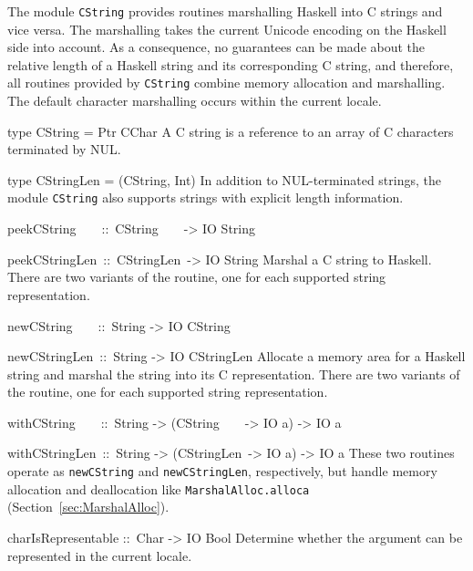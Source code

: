 \documentclass[a4paper,twoside]{article}
\makeatletter
\newcommand{\code}[1]{\texttt{#1}}      %
\newenvironment{codedesc}{%
  \list{}{\labelwidth\z@
    \let\makelabel\codedesclabel}
  }{%
  \endlist
  }
\newcommand*{\codedesclabel}[1]{%
  \hspace{-\leftmargin}
  \parbox[b]{\labelwidth}{\makebox[0pt][l]{\code{#1}}\\}\hfil\relax
  }
\newcommand{\combineitems}{\vspace*{-\itemsep}\vspace*{-\parsep}\vspace*{-1em}}
\makeatother
\begin{document}
The module \code{CString} provides routines marshalling Haskell into C strings
and vice versa.  The marshalling takes the current Unicode encoding on the
Haskell side into account.  As a consequence, no guarantees can be made about
the relative length of a Haskell string and its corresponding C string, and
therefore, all routines provided by \code{CString} combine memory allocation
and marshalling.  The default character marshalling occurs within the current
locale.
%
\begin{codedesc}
\item[type CString = Ptr CChar] A C string is a reference to an array of C
  characters terminated by NUL.

\item[type CStringLen = (CString, Int)] In addition to NUL-terminated strings,
  the module \code{CString} also supports strings with explicit length
  information. 

\item[peekCString~~~~::\ CString~~~~-> IO String]
\item[peekCStringLen~::\ CStringLen~-> IO String]\combineitems
  Marshal a C string to Haskell.  There are two variants of the routine, one
  for each supported string representation.

\item[newCString~~~~::\ String -> IO CString]
\item[newCStringLen~::\ String -> IO CStringLen] \combineitems Allocate a
  memory area for a Haskell string and marshal the string into its C
  representation.  There are two variants of the routine, one for each
  supported string representation.

\item[withCString~~~~::\ String -> (CString~~~~-> IO a) -> IO a]
\item[withCStringLen~::\ String -> (CStringLen~-> IO a) -> IO a] \combineitems
  These two routines operate as \code{newCString} and \code{newCStringLen},
  respectively, but handle memory allocation and deallocation like
  \code{MarshalAlloc.alloca} (Section~\ref{sec:MarshalAlloc}).
  
\item[charIsRepresentable ::\ Char -> IO Bool] Determine whether the argument
  can be represented in the current locale.

\end{codedesc}
\end{document}
